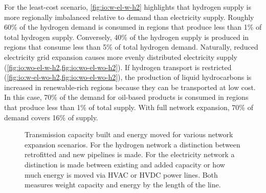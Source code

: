 For the least-cost scenario, \cref{fig:io:w-el-w-h2} highlights that hydrogen
supply is more regionally imbalanced relative to demand than electricity supply.
Roughly 60\% of the hydrogen demand is consumed in regions that produce less
than 1\% of total hydrogen supply. Conversely, 40\% of the hydrogen supply is
produced in regions that consume less than 5\% of total hydrogen demand.
Naturally, reduced electricity grid expansion causes more evenly distributed
electricity supply (\cref{fig:io:wo-el-w-h2,fig:io:wo-el-wo-h2}). If hydrogen
transport is restricted (\cref{fig:io:w-el-wo-h2,fig:io:wo-el-wo-h2}), the
production of liquid hydrocarbons is increased in renewable-rich regions because
they can be transported at low cost. In this case, 70\% of the demand for
oil-based products is consumed in regions that produce less than 1\% of total
supply. With full network expansion, 70\% of demand covers 16\% of supply.



\begin{figure}
    \centering
    \caption{Transmission capacity built and energy moved for various network expansion scenarios.
        For the hydrogen network a distinction between retrofitted and new pipelines is made.
        For the electricity network a distinction is made between existing and added capacity
        or how much energy is moved via HVAC or HVDC power lines. Both measures weight capacity
        and energy by the length of the line.}
    \label{fig:network-stats}
\end{figure}

